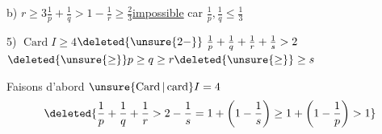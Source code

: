 b) $r\geq3$\qquad $\frac1p+\frac1q>1-\frac1r\geq\frac23$\qquad \uline{impossible} car $\frac1p,\frac1q\leq\frac13$

5) $\operatorname{Card} I\geq4$\qquad $\deleted{\unsure{2-}}\ \frac1p+\frac1q+\frac1r+\frac1s>2$\qquad $\deleted{\unsure{\geq}}p\geq q\geq r\deleted{\unsure{\geq}}\geq s$

Faisons d'abord $\unsure{\operatorname{Card}|\operatorname{card}} I=4$
\[
\deleted{\frac1p+\frac1q+\frac1r>2-\frac1s=1+\left(1-\frac1s\right)\geq1+\left(1-\frac1p\right)>1}
\]
